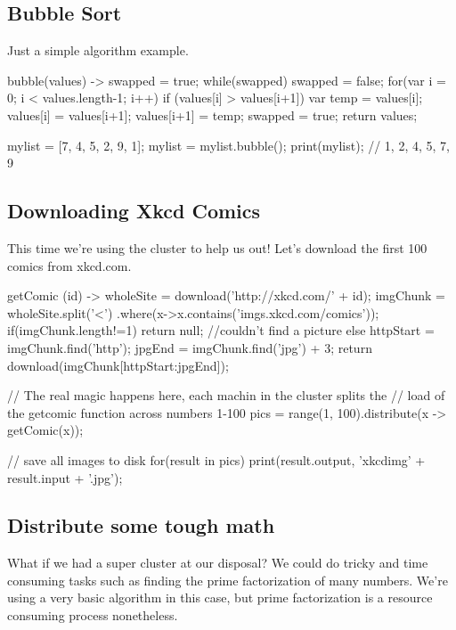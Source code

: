 \documentclass[letterpaper]{article}
\begin{document}
\subsection{Bubble Sort}
Just a simple algorithm example. \\[3em]
\begin{mdframed}[hidealllines=true,backgroundcolor=gray!10,skipbelow=1em,skipabove=.5em]
\begin{code}
bubble(values) -> {
	swapped = true;
	while(swapped) {
		swapped = false;
		for(var i = 0; i < values.length-1; i++) {
			if (values[i] > values[i+1]) {
				var temp = values[i];
				values[i] = values[i+1];
				values[i+1] = temp;
				swapped = true;
		  	}
		}
	}
	return values;
}

mylist = [7, 4, 5, 2, 9, 1];
mylist = mylist.bubble();
print(mylist); // 1, 2, 4, 5, 7, 9 
\end{code}
\end{mdframed}

\subsection{Downloading Xkcd Comics}
This time we're using the cluster to help us out! Let's download the first 100 comics from xkcd.com.
\begin{mdframed}[hidealllines=true,backgroundcolor=gray!10,skipbelow=1em,skipabove=.5em]
\begin{code}
getComic (id) -> {
	wholeSite = download('http://xkcd.com/' + id);
	imgChunk = wholeSite.split('<')
		.where(x->x.contains('imgs.xkcd.com/comics'));
	if(imgChunk.length!=1){ 
		return null; //couldn't find a picture
	}
	else{
		httpStart = imgChunk.find('http');
		jpgEnd = imgChunk.find('jpg') + 3;
		return download(imgChunk[httpStart:jpgEnd]);
	}
}

// The real magic happens here, each machin in the cluster splits the
// load of the getcomic function across numbers 1-100
pics = range(1, 100).distribute(x -> getComic(x));

// save all images to disk
for(result in pics) {
	print(result.output, 'xkcdimg' + result.input + '.jpg');
}
\end{code}
\end{mdframed}

\subsection{Distribute some tough math}
What if we had a super cluster at our disposal? We could do tricky and time consuming tasks such as finding the prime factorization of many numbers. We're using a very basic algorithm in this case, but prime factorization is a resource consuming process nonetheless. \\[2em]
\end{document}
